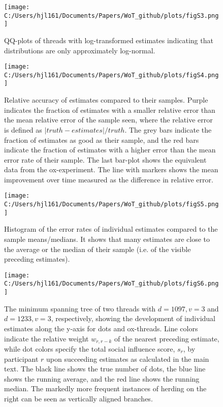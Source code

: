 \documentclass[9pt,twoside,lineno]{pnas-new}
\begin{document}
\begin{figure}
\centering
\texttt{[image: C:/Users/hjl161/Documents/Papers/WoT\_github/plots/figS3.png]}
\caption{QQ-plots of threads with log-transformed estimates indicating that distributions are only approximately log-normal.}
\end{figure}

\begin{figure}
\centering
\texttt{[image: C:/Users/hjl161/Documents/Papers/WoT\_github/plots/figS4.png]}
\caption{Relative accuracy of estimates compared to their samples. Purple indicates the fraction of estimates with a smaller relative error than the mean relative error of the sample seen, where the relative error is defined as $|truth-estimates|/truth$. The grey bars indicate the fraction of estimates as good as their sample, and the red bars indicate the fraction of estimates with a higher error than the mean error rate of their sample. The last bar-plot shows the equivalent data from the ox-experiment. The line with markers shows the mean improvement over time measured as the difference in relative error.}
\end{figure}

\begin{figure}
\centering
\texttt{[image: C:/Users/hjl161/Documents/Papers/WoT\_github/plots/figS5.png]}
\caption{Histogram of the error rates of individual estimates compared to the sample means/medians. It shows that many estimates are close to the average or the median of their sample (i.e. of the visible preceding estimates).}
\end{figure}

\begin{figure}
\centering
\texttt{[image: C:/Users/hjl161/Documents/Papers/WoT\_github/plots/figS6.png]}
\caption{The minimum spanning tree of two threads with $d=1097, v=3$ and $d=1233, v=3$, respectively, showing the development of individual estimates along the y-axis for dots and ox-threads. Line colors indicate the relative weight $w_{r,r-k}$ of the nearest preceding estimate, while dot colors specify the total social influence score, $s_r$, by participant $r$ upon succeeding estimates as calculated in the main text. The black line shows the true number of dots, the blue line shows the running average, and the red line shows the running median. The markedly more frequent instances of herding on the right can be seen as vertically aligned branches.}
\end{figure}
\end{document}
